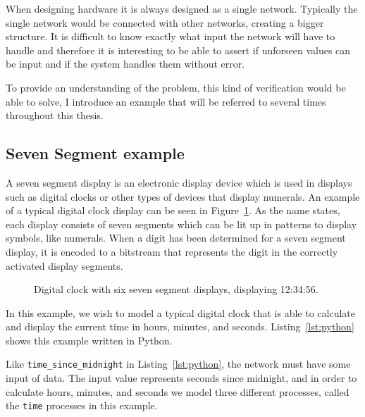 When designing hardware it is always designed as a single network. Typically the single network would be connected with other networks, creating a bigger structure. It is difficult to know exactly what input the network will have to handle and therefore it is interesting to be able to assert if unforseen values can be input and if the system handles them without error.

To provide an understanding of the problem, this kind of verification would be able to solve, I introduce an example that will be referred to several times throughout this thesis.

\subsection{Seven Segment example}
\label{sec:example-seven_segment_intro}
A seven segment display is an electronic display device which is used in displays such as digital clocks or other types of devices that display numerals. An example of a typical digital clock display can be seen in Figure~\ref{fig:6_displays}. As the name states, each display consists of seven segments which can be lit up in patterns to display symbols, like numerals.
When a digit has been determined for a seven segment display, it is encoded to a bitstream that represents the digit in the correctly activated display segments.
\begin{figure}[!ht]
  \begin{center}
  \end{center}
  \caption{Digital clock with six seven segment displays, displaying 12:34:56.}
  \label{fig:6_displays}
\end{figure}
In this example, we wish to model a typical digital clock that is able to calculate and display the current time in hours, minutes, and seconds. Listing~\ref{lst:python} shows this example written in Python.

Like \texttt{time\_since\_midnight} in Listing~\ref{lst:python}, the network must have some input of data. The input value represents seconds since midnight, and in order to calculate hours, minutes, and seconds we model three different processes, called the \texttt{time} processes in this example.

